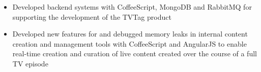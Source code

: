 \begin{itemize}
  \item Developed backend systems with CoffeeScript, MongoDB and RabbitMQ for
    supporting the development of the TVTag product
  \item Developed new features for and debugged memory leaks in internal content
    creation and management tools with CoffeeScript and AngularJS to enable
    real-time creation and curation of live content created over the course of a
    full TV episode
\end{itemize}
